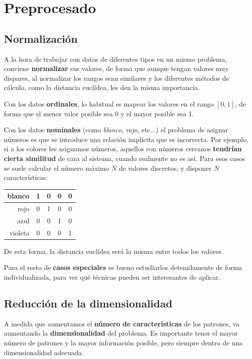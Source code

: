 \documentclass[11pt]{scrartcl}
\begin{document}
\section{Preprocesado}

\subsection{Normalización}

A la hora de trabajar con datos de diferentes tipos en un mismo problema,
conviene \textbf{normalizar} sus valores, de forma que aunque tengan valores muy
dispares, al normalizar los rangos sean similares y los diferentes métodos de
cálculo, como la distancia euclídea, les den la misma importancia.

Con los datos \textbf{ordinales}, lo habitual es mapear los valores en el rango
$[0, 1]$, de forma que el menor valor posible sea 0 y el mayor posible sea 1.

Con los datos \textbf{nominales} (como \textit{blanco}, \textit{rojo}, etc...)
el problema de asignar números es que se introduce una relación implícita que es
incorrecta. Por ejemplo, si a los colores les asignamos números, aquellos con
números cercanos \textbf{tendrían cierta similitud} de cara al sistema, cuando
realmente no es así. Para esos casos se suele calcular el número máximo $N$ de
valores discretos, y disponer $N$ características:

\begin{center}
  \begin{tabular}{r|c|c|c|c}
    blanco & 1 & 0 & 0 & 0 \\ \hline
    rojo   & 0 & 1 & 0 & 0 \\ \hline
    azul   & 0 & 0 & 1 & 0 \\ \hline
    violeta & 0 & 0 & 0 & 1
  \end{tabular}
\end{center}


De esta forma, la distancia euclídea será la misma entre todos los valores.

Para el resto de \textbf{casos especiales} es bueno estudiarlos detenidamente de
forma individualizada, para ver qué técnicas pueden ser interesantes de aplicar.

\subsection{Reducción de la dimensionalidad}

A medida que aumentamos el \textbf{número de características} de los patrones,
va aumentando la \textbf{dimensionalidad} del problema. Es importante tener el
mayor número de patrones y la mayor información posible, pero siempre dentro de
una dimensionalidad adecuada.
\end{document}

